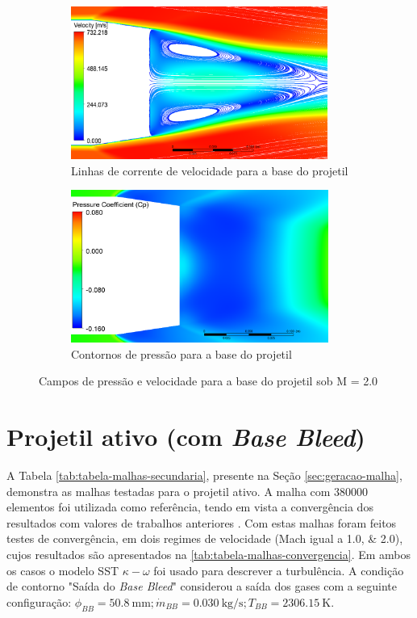 \begin{figure}[!ht]
    \centering
    \begin{subfigure}[b]{0.47\textwidth}
        \centering
        \includegraphics[height=5cm,width=\textwidth]{corrente-velocidade-off.png}
        \caption{Linhas de corrente de velocidade para a base do projetil}
        \label{fig:corrente-velocidade-base-sembasebleed}    
    \end{subfigure}
    \hfill
    \begin{subfigure}[b]{0.47\textwidth}
        \centering    
        \includegraphics[height=5cm,width=\textwidth]{coeficientepressao-INERTE.png}
        \caption{Contornos de pressão para a base do projetil}
        \label{fig:contorno-pressao-base-sembasebleed}
    \end{subfigure}
    \caption{Campos de pressão e velocidade para a base do projetil sob M = \num{2,0}}
    \label{fig:campos-pressao-velocidade-base-sembasebleed}
\end{figure}

\section{Projetil ativo (com \textit{Base Bleed})}\label{sec:resultados-com-basebleed}

A Tabela \ref{tab:tabela-malhas-secundaria}, presente na Seção \ref{sec:geracao-malha}, demonstra as malhas testadas para o projetil ativo. A malha com \num{380000} elementos foi utilizada como referência, tendo em vista a convergência dos resultados com valores de trabalhos anteriores \cite{Mahmoud2009}. Com estas malhas foram feitos testes de convergência, em dois regimes de velocidade (Mach igual a \numlist{1,0;2,0}), cujos resultados são apresentados na \autoref{tab:tabela-malhas-convergencia}. Em ambos os casos o modelo SST \(\kappa-\omega\) foi usado para descrever a turbulência. A condição de contorno "Saída do \textit{Base Bleed}"{} considerou a saída dos gases com a seguinte configuração: \(\phi_{BB} = \qty{50,8}{\milli\metre}; \Dot{m}_{BB} = \qty{0,030}{\kilogram\per\second}; T_{BB} = \qty{2306,15}{\kelvin}\).

